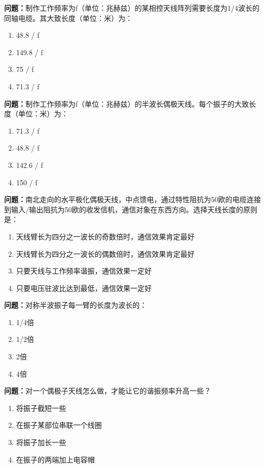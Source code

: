 \bigskip


\noindent\textbf{问题：}制作工作频率为f（单位：兆赫兹）的某相控天线阵列需要长度为1/4波长的同轴电缆。其大致长度（单位：米）为：
\begin{enumerate}[label=\Alph*), leftmargin=3em]
\item 48.8 / f
\item 149.8 / f
\item 75 / f
\item 71.3 / f
\end{enumerate}

\bigskip


\noindent\textbf{问题：}制作工作频率为f（单位：兆赫兹）的半波长偶极天线。每个振子的大致长度（单位：米）为：
\begin{enumerate}[label=\Alph*), leftmargin=3em]
\item 71.3 / f
\item 48.8 / f
\item 142.6 / f
\item 150 / f
\end{enumerate}

\bigskip


\noindent\textbf{问题：}南北走向的水平极化偶极天线，中点馈电，通过特性阻抗为50欧的电缆连接到输入/输出阻抗为50欧的收发信机，通信对象在东西方向。选择天线长度的原则是：
\begin{enumerate}[label=\Alph*), leftmargin=3em]
\item 天线臂长为四分之一波长的奇数倍时，通信效果肯定最好
\item 天线臂长为四分之一波长的偶数倍时，通信效果肯定最好
\item 只要天线与工作频率谐振，通信效果一定好
\item 只要电压驻波比达到最低，通信效果一定好
\end{enumerate}

\bigskip


\noindent\textbf{问题：}对称半波振子每一臂的长度为波长的：
\begin{enumerate}[label=\Alph*), leftmargin=3em]
\item 1/4倍
\item 1/2倍
\item 2倍
\item 4倍
\end{enumerate}

\bigskip


\noindent\textbf{问题：}对一个偶极子天线怎么做，才能让它的谐振频率升高一些？
\begin{enumerate}[label=\Alph*), leftmargin=3em]
\item 将振子截短一些
\item 在振子某部位串联一个线圈
\item 将振子加长一些
\item 在振子的两端加上电容帽
\end{enumerate}

